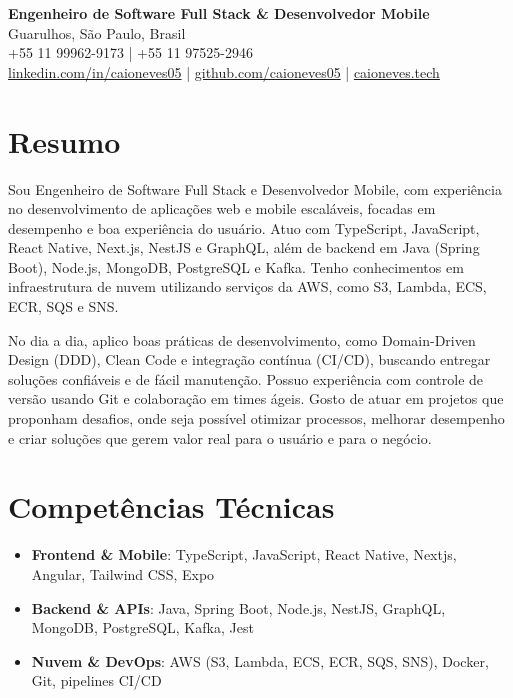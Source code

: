 \documentclass[11pt,letterpaper]{article}
\begin{document}
\begin{center}
    \textbf{\Large Engenheiro de Software Full Stack \& Desenvolvedor Mobile} \\
    \vspace{5pt}
    Guarulhos, São Paulo, Brasil \\
    +55 11 99962-9173 | +55 11 97525-2946 \\
    \href{https://www.linkedin.com/in/caioneves05}{linkedin.com/in/caioneves05} |
    \href{https://github.com/caioneves05}{github.com/caioneves05} |
    \href{http://caioneves.tech}{caioneves.tech}
\end{center}

\section{Resumo}
Sou Engenheiro de Software Full Stack e Desenvolvedor Mobile, com experiência no desenvolvimento de aplicações web e mobile escaláveis, focadas em desempenho e boa experiência do usuário. Atuo com TypeScript, JavaScript, React Native, Next.js, NestJS e GraphQL, além de backend em Java (Spring Boot), Node.js, MongoDB, PostgreSQL e Kafka. Tenho conhecimentos em infraestrutura de nuvem utilizando serviços da AWS, como S3, Lambda, ECS, ECR, SQS e SNS.

No dia a dia, aplico boas práticas de desenvolvimento, como Domain-Driven Design (DDD), Clean Code e integração contínua (CI/CD), buscando entregar soluções confiáveis e de fácil manutenção. Possuo experiência com controle de versão usando Git e colaboração em times ágeis. Gosto de atuar em projetos que proponham desafios, onde seja possível otimizar processos, melhorar desempenho e criar soluções que gerem valor real para o usuário e para o negócio.

\section{Competências Técnicas}
\begin{itemize}[leftmargin=*]
    \item \textbf{Frontend \& Mobile}: TypeScript, JavaScript, React Native, Nextjs, Angular, Tailwind CSS, Expo
    \item \textbf{Backend \& APIs}: Java, Spring Boot, Node.js, NestJS, GraphQL, MongoDB, PostgreSQL, Kafka, Jest
    \item \textbf{Nuvem \& DevOps}: AWS (S3, Lambda, ECS, ECR, SQS, SNS), Docker, Git, pipelines CI/CD
\end{itemize}
\end{document}
